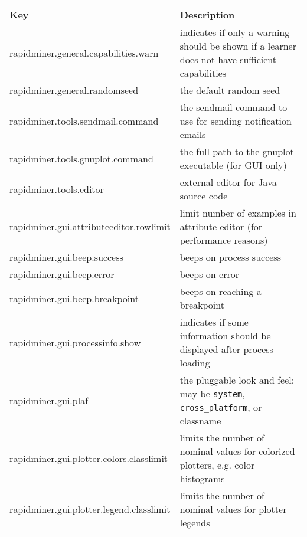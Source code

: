 \begin{table}[htbp]
  \renewcommand{\tabularxcolumn}[1]{p{#1}}
  \begin{tabularx}{\linewidth}{|Z|Y|}
    \hline
    \textbf{Key}               & \textbf{Description} \\
    \hline\hline
    rapidminer.general.capabilities.warn &  indicates if only a warning should be shown if a learner does not have sufficient capabilities \\
    rapidminer.general.randomseed     & the default random seed \\
    \hline
    rapidminer.tools.sendmail.command&  the sendmail command to use for sending notification emails \\
    rapidminer.tools.gnuplot.command &  the full path to the gnuplot executable (for GUI only) \\
    rapidminer.tools.editor          &  external editor for Java source code \\
    \hline
    rapidminer.gui.attributeeditor.rowlimit & limit number of examples in attribute editor (for performance reasons) \\
    rapidminer.gui.beep.success      &  beeps on process success \\
    rapidminer.gui.beep.error        &  beeps on error \\
    rapidminer.gui.beep.breakpoint   &  beeps on reaching a breakpoint \\
    rapidminer.gui.processinfo.show & indicates if some information should be displayed after process loading \\
    rapidminer.gui.plaf          & the pluggable look and feel; may be {\tt system}, {\tt cross\_{}platform}, or classname \\
    rapidminer.gui.plotter.colors.classlimit & limits the number of nominal values for colorized plotters, e.g. color histograms \\
    rapidminer.gui.plotter.legend.classlimit & limits the number of nominal values for plotter legends \\

\end{tabularx}
\end{table}
